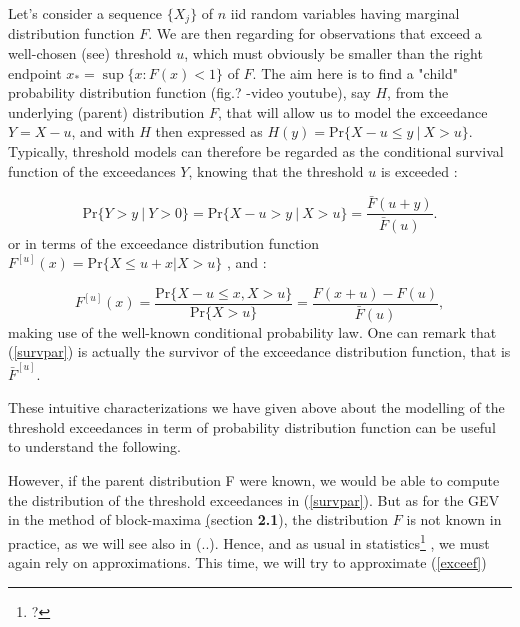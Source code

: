 \documentclass[11pt,a4paper,openany ]{book}
\begin{document}
Let's consider a sequence $\{X_j\}$ of $n$ iid random variables having marginal distribution function $F$. We are then regarding for observations that exceed a well-chosen (see) threshold $u$, which must obviously be smaller than the right endpoint $x_*=\sup\{x:F(x)<1\}$ of $F$. The aim here is to find a "child" probability distribution function (fig.? -video youtube), say $H$, from the underlying (parent) distribution $F$, that will allow us to model the exceedance $Y=X-u$, and  with $H$ then expressed as $\boxed{H(y)=\text{Pr}\{X-u\leq y \ | \ X>u\}}$. Typically, threshold models can therefore be regarded as the conditional survival function of the exceedances $Y$, knowing that the threshold $u$ is exceeded \cite[pp.147]{beirlant_statistics_2006} :

\begin{equation}\label{survpar}
\text{Pr}\big\{Y>y\ |\ Y>0\big\}=\text{Pr}\big\{X-u>y\ |\ X>u\big\}=\frac{\bar{F}(u+y)}{\bar{F}(u)}.
\end{equation}
or in terms of the exceedance distribution function $F^{[u]}(x)=\text{Pr}\{X\leq u+x|X>u\}$
\cite[pp.12]{reiss_statistical_2007}, \cite{charras_extreme_2013} and \cite{rosso_extreme_2015} :

\begin{equation}\label{exceef}
F^{[u]}(x)=\frac{\text{Pr}\{X-u\leq 
x,X>u\}}{\text{Pr}\{X>u\}}=\frac{F(x+u)-F(u)}{\bar{F}(u)},
\end{equation}
making use of the well-known conditional probability law. One can remark that (\ref{survpar}) is actually the survivor of the exceedance distribution function, that is $\bar{F}^{[u]}$.

These intuitive characterizations we have given above about the modelling of the threshold exceedances in term of probability distribution function can be useful to understand the following. 

However, if the parent distribution F were known, we would be able to compute the distribution of the threshold exceedances in (\ref{survpar}). \cite[pp.74]{coles_introduction_2001} But as for the GEV in the method of block-maxima \hyperref[](section \textbf{2.1}), the distribution $F$ is not known in practice, as we will see also in (..). Hence, and as usual in statistics\footnote{?}%
, we must again rely on approximations. This time, we will try to approximate (\ref{exceef})
\end{document}
